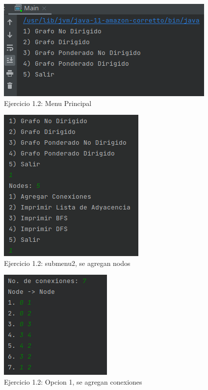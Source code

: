 \documentclass{article}
\begin{document}
			\begin{figure}[H]
				\centering
				\includegraphics[scale= 0.9]{images/e121.png}
				\caption*{Ejercicio 1.2: Menu Principal}
			\end{figure}
	
			\begin{figure}[H]
				\centering
				\includegraphics[scale= 0.9]{images/e122.png}
				\caption*{Ejercicio 1.2: submenu2, se agregan nodos}
			\end{figure}
		
			\begin{figure}[H]
				\centering
				\includegraphics[scale= 1]{images/e123.png}
				\caption*{Ejercicio 1.2: Opcion 1, se agregan conexiones}
			\end{figure}
		
\end{document}
